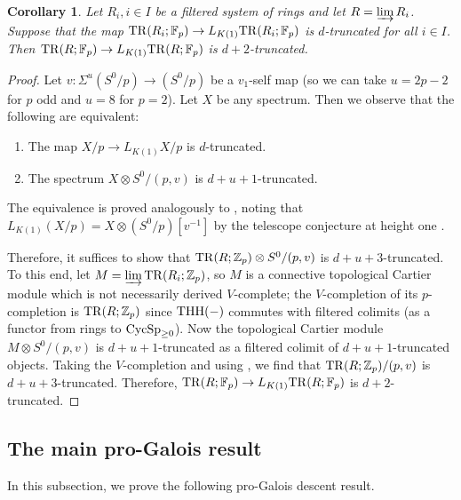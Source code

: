 \documentclass{amsart}
\newtheorem{corollary}[theorem]{Corollary}
\theoremstyle{definition}
\begin{document}
\begin{corollary} 
\label{colimtruncatedTR}
Let $R_i, i \in I$ be a filtered system of rings and let $R = \varinjlim R_i$. 
Suppose that 
the map $\mathrm{TR}(R_i; \mathbb{F}_p) \to L_{K(1)} \mathrm{TR}(R_i ; \mathbb{F}_p)$ is
$d$-truncated for all $i \in I$. 
Then $\mathrm{TR}(R; \mathbb{F}_p) \to L_{K(1)} \mathrm{TR}(R; \mathbb{F}_p)$ is $
d+2$-truncated. 
\end{corollary} 
\begin{proof} 
Let $v\colon  \Sigma^u (S^0/p) \to (S^0/p)$ be a $v_1$-self map (so we can take $u  =
2p-2$ for $p$ odd and $u = 8 $ for $p = 2$). 
Let $X$ be any spectrum. Then we 
observe that the following are equivalent: 
\begin{enumerate}
\item The map $X/p \to L_{K(1)} X/p$ is $d$-truncated.  
\item The spectrum $X \otimes S^0/(p, v)$ is $d + u+ 1$-truncated. 
\end{enumerate}
The equivalence is proved analogously to , noting that $L_{K(1)} (X/p) =
X \otimes (S^0/p)[v^{-1}]$ by the telescope conjecture at height one
\cite{Ma81, Mi81}. 

Therefore, it suffices to show that 
$\mathrm{TR}(R; \mathbb{Z}_p) \otimes S^0/(p, v)$ is $d + u+3$-truncated. 
To this end, let $M = \varinjlim \mathrm{TR}(R_i; \mathbb{Z}_p)$, so $M$ is a
connective topological Cartier module which is not necessarily derived
$V$-complete; the 
$V$-completion
of its $p$-completion
is $\mathrm{TR}(R; \mathbb{Z}_p)$ since $\mathrm{THH}(-)$ commutes with filtered colimits (as a
functor from rings to $\mathrm{CycSp}_{\geq 0}$). 
Now the topological Cartier module $M \otimes S^0/(p, v)$ is $d + u +
1$-truncated as a filtered colimit of $d + u + 1$-truncated objects. 
Taking the $V$-completion and using 
, 
we find that $\mathrm{TR}(R; \mathbb{Z}_p)/(p, v)$ is $d + u + 3$-truncated. 
Therefore, $\mathrm{TR}(R; \mathbb{F}_p) \to L_{K(1)}
\mathrm{TR}(R; \mathbb{F}_p)$ is $d+2$-truncated. 
\end{proof} 


\subsection{The main pro-Galois result}
In this subsection, we prove the following pro-Galois descent result. 
\end{document}
